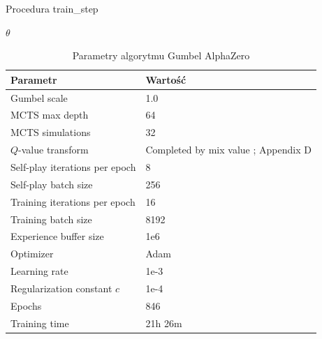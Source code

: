 \begin{algorithm}
    \caption{Procedura train\_step}\label{alg:alphazero-train-step}
    \Return $\theta$\;
\end{algorithm}

\begin{table}
    \centering
    \caption{Parametry algorytmu Gumbel AlphaZero}
    \label{tab:gumbel-alphazero-params}
    \begin{tabular}{ll}
        \toprule
        Parametr & Wartość \\ \midrule
        Gumbel scale \cite{GumbelAZ} & 1.0 \\
        MCTS max depth & 64 \\
        MCTS simulations & 32 \\
        $Q$-value transform & Completed by mix value \cite{GumbelAZ}; Appendix D \\
        Self-play iterations per epoch & 8 \\
        Self-play batch size & 256 \\
        Training iterations per epoch & 16 \\
        Training batch size & 8192 \\
        Experience buffer size & 1e6 \\
        Optimizer & Adam \cite{Adam} \\
        Learning rate & 1e-3 \\
        Regularization constant $c$ & 1e-4 \\
        Epochs & 846 \\
        Training time & 21h 26m \\
        \bottomrule
    \end{tabular}
\end{table}

